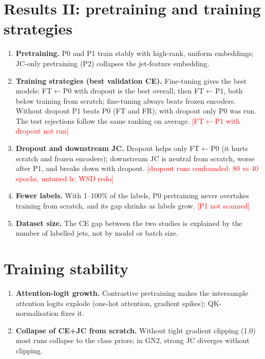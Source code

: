 \documentclass[11pt,a4paper]{article}
\newcommand{\from}[2]{#1$\leftarrow$#2}
\newcommand{\open}[1]{\textcolor{red}{[#1]}}
\begin{document}
\section{Results II: pretraining and training strategies}
\begin{enumerate}
  \item \textbf{Pretraining.} P0 and P1 train stably with high-rank, uniform embeddings;
        JC-only pretraining (P2) collapses the jet-feature embedding.
  \item \textbf{Training strategies (best validation CE).} Fine-tuning gives the best models:
        \from{FT}{P0} with dropout is the best overall, then \from{FT}{P1}, both below training
        from scratch; fine-tuning always beats frozen encoders. Without dropout P1 beats P0
        (FT and FR); with dropout only P0 was run. The test rejections follow the same ranking
        on average. \open{\from{FT}{P1} with dropout not run}
  \item \textbf{Dropout and downstream JC.} Dropout helps only \from{FT}{P0} (it hurts scratch
        and frozen encoders); downstream JC is neutral from scratch, worse after P1, and breaks
        down with dropout. \open{dropout runs confounded: 80 vs 40 epochs, untuned lr; WSD redo}
  \item \textbf{Fewer labels.} With 1--100\% of the labels, P0 pretraining never overtakes
        training from scratch, and its gap shrinks as labels grow. \open{P1 not scanned}
  \item \textbf{Dataset size.} The CE gap between the two studies is explained by the number of
        labelled jets, not by model or batch size.
\end{enumerate}

\section{Training stability}
\begin{enumerate}
  \item \textbf{Attention-logit growth.} Contrastive pretraining makes the intersample attention
        logits explode (one-hot attention, gradient spikes); QK-normalisation fixes it.
  \item \textbf{Collapse of CE+JC from scratch.} Without tight gradient clipping (1.0) most runs
        collapse to the class priors; in GN2, strong JC diverges without clipping.
\end{enumerate}
\end{document}
